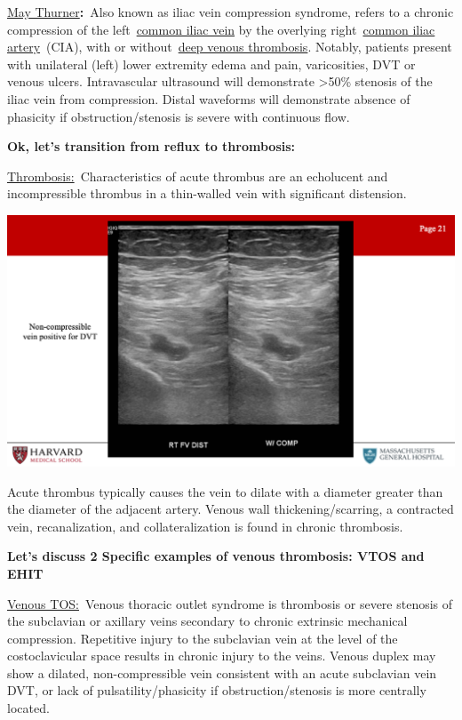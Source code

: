 \documentclass[
]{book}
\begin{document}
\uline{May Thurner}\textbf{:}~Also known as iliac vein compression
syndrome, refers to a chronic compression of the left~\href{https://radiopaedia.org/articles/common-iliac-vein?lang=us}{common iliac
vein} by the
overlying right~\href{https://radiopaedia.org/articles/common-iliac-artery?lang=us}{common iliac
artery}~(CIA),
with or without~\href{https://radiopaedia.org/articles/deep-vein-thrombosis?lang=us}{deep venous
thrombosis}.
Notably, patients present with unilateral (left) lower extremity edema
and pain, varicosities, DVT or venous ulcers. Intravascular ultrasound
will demonstrate \textgreater50\% stenosis of the iliac vein from compression.
Distal waveforms will demonstrate absence of phasicity if
obstruction/stenosis is severe with continuous flow.

\textbf{Ok, let's transition from reflux to thrombosis:}

\uline{Thrombosis:}~Characteristics of acute thrombus are an
echolucent and incompressible thrombus in a thin-walled vein with
significant distension.

\includegraphics[width=15.01in]{images/vasc_lab2/Slide22}

Acute thrombus typically causes the vein to dilate with a diameter
greater than the diameter of the adjacent artery. Venous wall
thickening/scarring, a contracted vein, recanalization, and
collateralization is found in chronic thrombosis.

\textbf{Let's discuss 2 Specific examples of venous thrombosis: VTOS and
EHIT}

\uline{Venous TOS:}~Venous thoracic outlet syndrome is thrombosis
or severe stenosis of the subclavian or axillary veins secondary to
chronic extrinsic mechanical compression. Repetitive injury to the
subclavian vein at the level of the costoclavicular space results in
chronic injury to the veins. Venous duplex may show a dilated,
non-compressible vein consistent with an acute subclavian vein DVT, or
lack of pulsatility/phasicity if obstruction/stenosis is more centrally
located.
\end{document}
